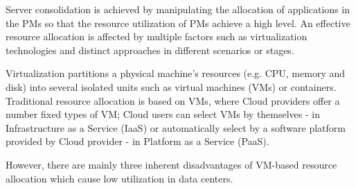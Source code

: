 

Server consolidation is achieved by manipulating the allocation of applications in the PMs so that the resource utilization of PMs achieve a high level. An effective resource allocation is affected by multiple factors such as virtualization technologies and distinct approaches in different scenarios or stages.

Virtualization \cite{Uhlig:2005do} partitions a physical machine's resources (e.g. CPU, memory and disk) into several isolated units such as virtual machines (VMs) or containers. Traditional resource allocation is based on VMs, where Cloud providers offer a number fixed types of VM; Cloud users can select VMs by themselves - in Infrastructure as a Service (IaaS) or automatically select by a software platform provided by Cloud provider - in Platform as a Service (PaaS). 

However, there are mainly three inherent disadvantages of VM-based resource allocation which cause low utilization in data centers.


